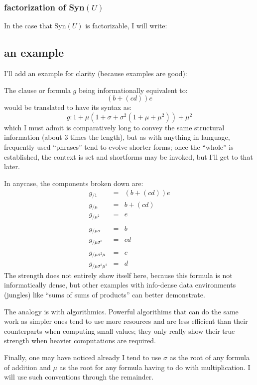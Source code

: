 \documentclass[twoside]{book}
\newcommand{\pass}[1][\Diamond]{\ensuremath{{_{\!/{#1}}}}}
\newcommand{\passes}[2][\Diamond]{\ensuremath{{_{\!/{#1}^{#2}}}}}
\newcommand{\syntaxes}[1][\Diamond]{\ensuremath{1+{#1}+{#1}^2}}
\begin{document}
\subsubsection{factorization of Syn$ (U) $}

In the case that Syn$ (U) $ is factorizable, I will write:

\subsection{an example}

I'll add an example for clarity (because examples are good):

The clause or formula $ g $ being informationally equivalent to:
$$ (b+(cd))e $$
would be translated to have its syntax as:
$$ g:1+\mu(\syntaxes[\sigma](\syntaxes[\mu]))+\mu^2 $$
which I must admit is comparatively long to convey the same structural information (about $ 3 $ times the length),
but as with anything in language, frequently used ``phrases'' tend to evolve shorter forms; once the ``whole'' is
established, the context is set and shortforms may be invoked, but I'll get to that later.

In anycase, the components broken down are:
\begin{eqnarray*}
g\pass[1] & = & (b+(cd))e\\
g\pass[\mu] & = & b+(cd)\\
g\passes[\mu]{2} & = & e\\
 &   & \\
g\pass[\mu\sigma] & = & b\\
g\pass[\mu\sigma^2] & = & cd\\
 &   & \\
g\pass[\mu\sigma^2\mu] & = & c\\
g\pass[\mu\sigma^2\mu^2] & = & d
\end{eqnarray*}
The strength does not entirely show itself here, because this formula is not informatically dense, but other examples
with info-dense data environments (jungles) like ``sums of sums of products'' can better demonstrate.

The analogy is with algorithmics.  Powerful algorithims that can do the same work as simpler ones tend to use more
resources and are less efficient than their counterparts when computing small values; they only really show their true
strength when heavier computations are required.

Finally, one may have noticed already I tend to use $ \sigma $ as the root of any formula of addition and $ \mu $ as the
root for any formula having to do with multiplication.  I will use such conventions through the remainder.
\end{document}
